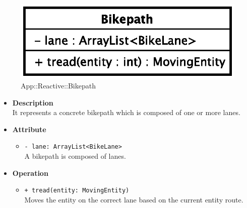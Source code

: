 \begin{figure}[h]
\centering
\includegraphics[scale=0.6,keepaspectratio]{images/solution/bikepath.eps}
\caption{App::Reactive::Bikepath}
\label{fig:sd-app-bikepath}
\end{figure}
\FloatBarrier
\begin{itemize}
  \item \textbf{Description} \\
    It represents a concrete bikepath which is composed of one or more lanes.
  \item \textbf{Attribute}
  \begin{itemize}
    \item \texttt{- lane: ArrayList<BikeLane>} \\
A bikepath is composed of lanes.
  \end{itemize}
  \item \textbf{Operation}
  \begin{itemize} 
    \item \texttt{+ tread(entity: MovingEntity)} \\
Moves the entity on the correct lane based on the current entity route. 
  \end{itemize}
\end{itemize}
